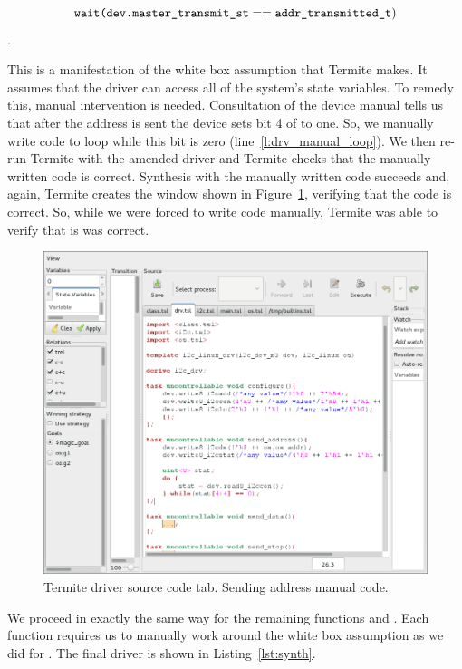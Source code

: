 $$\texttt{wait(dev.master\_transmit\_st} == \texttt{addr\_transmitted\_t})$$.

This is a manifestation of the white box assumption that Termite makes. It assumes that the driver can access all of the system's state variables. To remedy this, manual intervention is needed. Consultation of the device manual tells us that after the address is sent the device sets bit 4 of  to one. So, we manually write code to loop while this bit is zero (line~\ref{l:drv_manual_loop}). We then re-run Termite with the amended driver and Termite checks that the manually written code is correct. Synthesis with the manually written code succeeds and, again, Termite creates the window shown in Figure~\ref{fig:driver_tab_addr_man}, verifying that the code is correct. So, while we were forced to write code manually, Termite was able to verify that is was correct.

\begin{figure}
    \center
    \includegraphics[width=\linewidth]{imgs/screenshot_4.png}
    \caption{Termite driver source code tab. Sending address manual code.}
    \label{fig:driver_tab_addr_man}
\end{figure}

We proceed in exactly the same way for the remaining functions  and . Each function requires us to manually work around the white box assumption as we did for . The final driver is shown in Listing~\ref{lst:synth}.

